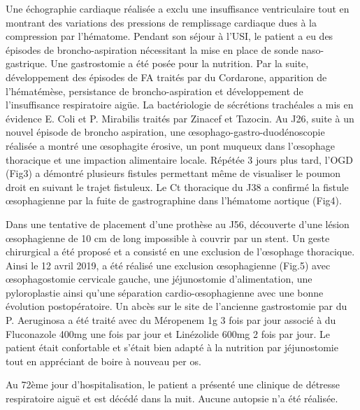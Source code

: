 \documentclass[./tfe]{subfiles}
\begin{document}
Une échographie cardiaque réalisée a exclu une insuffisance ventriculaire tout en montrant des variations des pressions de remplissage cardiaque dues à la compression par l'hématome.
Pendant son séjour à l’USI, le patient a eu des épisodes de broncho-aspiration nécessitant la mise en place de sonde naso-gastrique. Une gastrostomie a été posée pour la nutrition. Par la suite, développement des épisodes de FA traités par du Cordarone, apparition de l’hématémèse, persistance de broncho-aspiration et développement de l’insuffisance respiratoire aigüe. La bactériologie de sécrétions trachéales a mis en évidence E. Coli et P. Mirabilis traités par Zinacef et Tazocin. Au J26, suite à un nouvel épisode de broncho aspiration, une œsophago-gastro-duodénoscopie réalisée a montré une œsophagite érosive, un pont muqueux dans l'œsophage thoracique et une impaction alimentaire locale. Répétée 3 jours plus tard, l’OGD (Fig3) a démontré plusieurs fistules permettant même de visualiser le poumon droit en suivant le trajet fistuleux. Le Ct thoracique du J38 a confirmé la fistule œsophagienne par la fuite de gastrographine dans l’hématome aortique (Fig4).

Dans une tentative de placement d’une prothèse au J56, découverte d’une lésion œsophagienne de 10 cm de long impossible à couvrir par un stent. Un geste chirurgical a été proposé et a consisté en une exclusion de l'œsophage thoracique. Ainsi le 12 avril 2019, a été réalisé une exclusion œsophagienne (Fig.5) avec œsophagostomie cervicale gauche, une jéjunostomie d’alimentation, une pyloroplastie ainsi qu’une séparation cardio-œsophagienne avec une bonne évolution postopératoire. Un abcès sur le site de l’ancienne gastrostomie par du P. Aeruginosa a été traité avec du Méropenem 1g  3 fois par jour associé à du Fluconazole 400mg une fois par jour et Linézolide 600mg 2 fois par jour. Le patient était confortable et s’était bien adapté à la nutrition par jéjunostomie tout en appréciant de boire à nouveau per os.

Au 72ème jour d’hospitalisation, le patient a présenté une clinique de détresse respiratoire aiguë et est décédé dans la nuit. Aucune autopsie n'a été réalisée.
\end{document}
